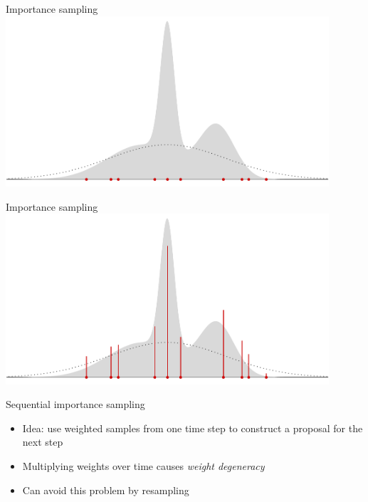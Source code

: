 \documentclass[aspectratio=169]{beamer}
\theoremstyle{definition}
\begin{document}
\begin{frame}{Importance sampling}
\centering
\includegraphics[width=0.9\textwidth]{importance2.pdf}

\end{frame}

\begin{frame}{Importance sampling}
\centering
\includegraphics[width=0.9\textwidth]{importance3.pdf}

\end{frame}


\begin{frame}{Sequential importance sampling}
\begin{itemize}
\item Idea: use weighted samples from one time step to construct a proposal for the next step
\pause
\item Multiplying weights over time causes \textit{weight degeneracy}%
\pause
\item Can avoid this problem by resampling

\end{itemize}

\end{frame}
\end{document}
